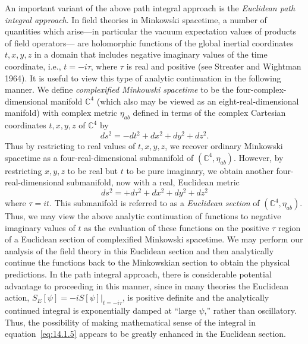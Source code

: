 An important variant of the above path integral approach is the \emph{Euclidean path
integral approach}. In field theories in Minkowski spacetime, a number of quantities
which arise---in particular the vacuum expectation values of products of field operators---
are holomorphic functions of the global inertial coordinates \(t,x,y,z\) in a
domain that includes negative imaginary values of the time coordinate, i.e.,
\(t=-i\tau\), where \(\tau\) is real and positive (see Streater and Wightman 1964). It is
useful to view this type of analytic continuation in the following manner. We define
\emph{complexified Minkowski spacetime} to be the four-complex-dimensional manifold
\(\mathbb C^4\) (which also may be viewed as an eight-real-dimensional manifold) with
complex metric \(\eta_{ab}\) defined in terms of the complex Cartesian coordinates
\(t,x,y,z\) of \(\mathbb C^4\) by
\begin{equation}
  ds^2=-dt^2+dx^2+dy^2+dz^2.
  \tag{14.1.7}\label{eq:14.1.7}
\end{equation}
Thus by restricting to real values of \(t,x,y,z\), we recover ordinary Minkowski
spacetime as a four-real-dimensional submanifold of \((\mathbb C^4,\eta_{ab})\). However,
by restricting \(x,y,z\) to be real but \(t\) to be pure imaginary, we obtain another
four-real-dimensional submanifold, now with a real, Euclidean metric
\begin{equation}
  ds^2=+d\tau^2+dx^2+dy^2+dz^2
  \tag{14.1.8}\label{eq:14.1.8}
\end{equation}
where \(\tau=it\). This submanifold is referred to as a \emph{Euclidean section} of
\((\mathbb C^4,\eta_{ab})\). Thus, we may view the above analytic continuation of
functions to negative imaginary values of \(t\) as the evaluation of these functions on
the positive \(\tau\) region of a Euclidean section of complexified Minkowski spacetime.
We may perform our analysis of the field theory in this Euclidean section and then
analytically continue the functions back to the Minkowskian section to obtain the
physical predictions. In the path integral approach, there is considerable potential
advantage to proceeding in this manner, since in many theories the Euclidean action,
\(S_E[\psi]=-iS[\psi]\rvert_{t=-i\tau}\), is positive definite and the analytically
continued integral is exponentially damped at ``large \(\psi\),'' rather than oscillatory.
Thus, the possibility of making mathematical sense of the integral in
equation~\eqref{eq:14.1.5} appears to be greatly enhanced in the Euclidean section.

